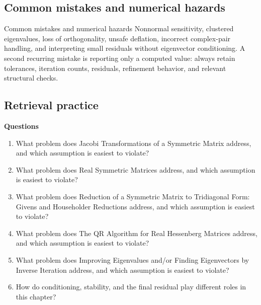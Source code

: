 \documentclass[10pt,letterpaper]{article}
\begin{document}
\subsection*{Common mistakes and numerical hazards}
\begin{warnbox}{Common mistakes and numerical hazards}
Nonnormal sensitivity, clustered eigenvalues, loss of orthogonality, unsafe deflation, incorrect complex-pair handling, and interpreting small residuals without eigenvector conditioning.  A second recurring mistake is reporting only a computed value: always retain tolerances, iteration counts, residuals, refinement behavior, and relevant structural checks.
\end{warnbox}

\subsection*{Retrieval practice}
\textbf{Questions}
\begin{enumerate}
\item What problem does Jacobi Transformations of a Symmetric Matrix address, and which assumption is easiest to violate?
\item What problem does Real Symmetric Matrices address, and which assumption is easiest to violate?
\item What problem does Reduction of a Symmetric Matrix to Tridiagonal Form: Givens and Householder Reductions address, and which assumption is easiest to violate?
\item What problem does The QR Algorithm for Real Hessenberg Matrices address, and which assumption is easiest to violate?
\item What problem does Improving Eigenvalues and/or Finding Eigenvectors by Inverse Iteration address, and which assumption is easiest to violate?
\item How do conditioning, stability, and the final residual play different roles in this chapter?
\end{enumerate}
\end{document}
